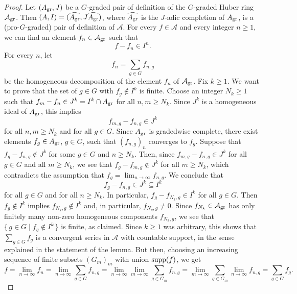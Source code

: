 \documentclass[12pt,twoside,a4paper]{article}
\theoremstyle{definition}
\theoremstyle{remark}
\newcommand\gr{{\rm gr}}
\newcommand\supp{{\rm supp}}
\begin{document}
\begin{proof}Let $(A_{\gr}, J)$ be a $G$-graded pair of definition of the $G$-graded Huber ring $\mathcal{A}_{\gr}$. Then $(A, I)=(\widehat{A_{\gr}}, J\widehat{A_{\gr}})$, where $\widehat{A_{\gr}}$ is the $J$-adic completion of $A_{\gr}$, is a (pro-$G$-graded) pair of definition of $\mathcal{A}$. For every $f\in \mathcal{A}$ and every integer $n\geq1$, we can find an element $f_{n}\in \mathcal{A}_{\gr}$ such that \begin{equation*}f-f_{n}\in I^{n}.\end{equation*}For every $n$, let \begin{equation*}f_{n}=\sum_{g\in G}f_{n, g}\end{equation*}be the homogeneous decomposition of the element $f_{n}$ of $\mathcal{A}_{\gr}$. Fix $k\geq1$. We want to prove that the set of $g\in G$ with $f_{g}\not\in I^{k}$ is finite. Choose an integer $N_{k}\geq1$ such that $f_{m}-f_{n}\in J^{k}=I^{k}\cap A_{\gr}$ for all $n, m\geq N_{k}$. Since $J^{k}$ is a homogeneous ideal of $A_{\gr}$, this implies \begin{equation*}f_{m, g}-f_{n, g}\in J^{k}\end{equation*}for all $n, m\geq N_{k}$ and for all $g\in G$. Since $A_{\gr}$ is gradedwise complete, there exist elements $f_{g}\in A_{\gr}$, $g\in G$, such that $(f_{n, g})_{n}$ converges to $f_{g}$. Suppose that $f_{g}-f_{n, g}\not\in J^{k}$ for some $g\in G$ and $n\geq N_{k}$. Then, since $f_{m, g}-f_{n, g}\in J^{k}$ for all $g\in G$ and all $m\geq N_{k}$, we see that $f_{g}-f_{m, g}\not\in J^{k}$ for all $m\geq N_{k}$, which contradicts the assumption that $f_{g}=\lim_{n\to\infty}f_{n, g}$. We conclude that \begin{equation*}f_{g}-f_{n, g}\in J^{k}\subseteq I^{k}\end{equation*}for all $g\in G$ and for all $n\geq N_{k}$. In particular, $f_{g}-f_{N_{k}, g}\in I^{k}$ for all $g\in G$. Then $f_{g}\not\in I^{k}$ implies $f_{N_{k}, g}\not\in I^{k}$ and, in particular, $f_{N_{k}, g}\neq0$. Since $f_{N_{k}}\in \mathcal{A}_{\gr}$ has only finitely many non-zero homogeneous components $f_{N_{k}, g}$, we see that $\{\, g\in G\mid f_{g}\not\in I^{k}\,\}$ is finite, as claimed. Since $k\geq1$ was arbitrary, this shows that $\sum_{g\in G}f_{g}$ is a convergent series in $\mathcal{A}$ with countable support, in the sense explained in the statement of the lemma. But then, choosing an increasing sequence of finite subsets $(G_{m})_{m}$ with union $\supp(f)$, we get \begin{equation*}f=\lim_{n\to\infty}f_{n}=\lim_{n\to\infty}\sum_{g\in G}f_{n, g}=\lim_{n\to\infty}\lim_{m\to\infty}\sum_{g\in G_{m}}f_{n, g}=\lim_{m\to\infty}\sum_{g\in G_{m}}\lim_{n\to\infty}f_{n, g}=\sum_{g\in G}f_{g}.\end{equation*}


\end{proof}
\end{document}
